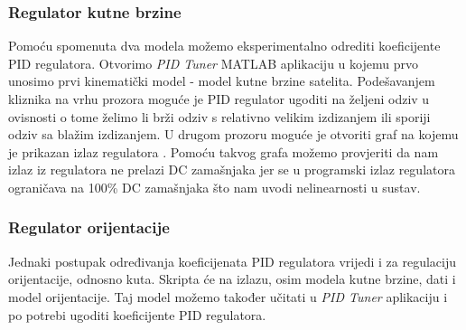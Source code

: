 \documentclass[times, utf8, diplomski, numeric]{templates/template}
\begin{document}
{{{            %

            \subsubsection{Regulator kutne brzine}{
                Pomoću spomenuta dva modela možemo eksperimentalno odrediti koeficijente PID regulatora. Otvorimo \emph{PID Tuner} MATLAB aplikaciju \cite{pid_tuner} u kojemu prvo unosimo prvi kinematički model - model kutne brzine satelita. Podešavanjem kliznika na vrhu prozora moguće je PID regulator ugoditi na željeni odziv u ovisnosti o tome želimo li brži odziv s relativno velikim izdizanjem  ili sporiji odziv sa blažim izdizanjem. U drugom prozoru moguće je otvoriti graf na kojemu je prikazan izlaz regulatora . Pomoću takvog grafa možemo provjeriti da nam izlaz iz regulatora ne prelazi DC zamašnjaka jer se u programski izlaz regulatora ograničava na 100\% DC zamašnjaka što nam uvodi nelinearnosti u sustav. 
            }

            \subsubsection{Regulator orijentacije}{
                Jednaki postupak određivanja koeficijenata PID regulatora vrijedi i za regulaciju orijentacije, odnosno kuta. Skripta će na izlazu, osim modela kutne brzine, dati i model orijentacije. Taj model možemo također učitati u \emph{PID Tuner} aplikaciju i po potrebi ugoditi koeficijente PID regulatora.
            }
        }
    }

}
\end{document}
